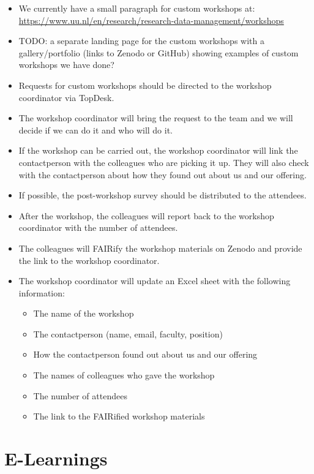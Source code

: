 \documentclass[
  letterpaper,
  DIV=11,
  numbers=noendperiod]{scrreprt}
\providecommand{\tightlist}{%
  \setlength{\itemsep}{0pt}\setlength{\parskip}{0pt}}\usepackage{longtable,booktabs,array}
\begin{document}
\begin{itemize}
\item
  We currently have a small paragraph for custom workshops at:
  \url{https://www.uu.nl/en/research/research-data-management/workshops}
\item
  TODO: a separate landing page for the custom workshops with a
  gallery/portfolio (links to Zenodo or GitHub) showing examples of
  custom workshops we have done?
\item
  Requests for custom workshops should be directed to the workshop
  coordinator via TopDesk.
\item
  The workshop coordinator will bring the request to the team and we
  will decide if we can do it and who will do it.
\item
  If the workshop can be carried out, the workshop coordinator will link
  the contactperson with the colleagues who are picking it up. They will
  also check with the contactperson about how they found out about us
  and our offering.
\item
  If possible, the post-workshop survey should be distributed to the
  attendees.
\item
  After the workshop, the colleagues will report back to the workshop
  coordinator with the number of attendees.
\item
  The colleagues will FAIRify the workshop materials on Zenodo and
  provide the link to the workshop coordinator.
\item
  The workshop coordinator will update an Excel sheet with the following
  information:

  \begin{itemize}
  \tightlist
  \item
    The name of the workshop
  \item
    The contactperson (name, email, faculty, position)
  \item
    How the contactperson found out about us and our offering
  \item
    The names of colleagues who gave the workshop
  \item
    The number of attendees
  \item
    The link to the FAIRified workshop materials
  \end{itemize}
\end{itemize}


\chapter*{E-Learnings}\label{e-learnings}
\end{document}
